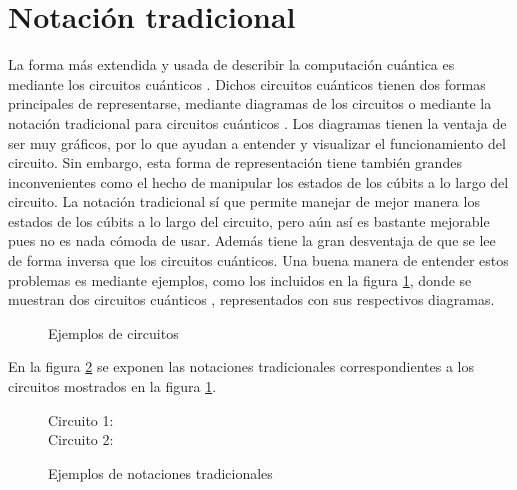 \documentclass[10pt,conference,a4paper]{IEEEtran}
\begin{document}
    \section{Notación tradicional}
    \label{seccion:2}
    La forma más extendida y usada de describir la computación cuántica es mediante los circuitos cuánticos \cite{Deutsch}. Dichos circuitos cuánticos tienen dos formas principales de representarse, mediante diagramas de los circuitos o mediante la notación tradicional para circuitos cuánticos \cite{Nielsen_Chuang}. Los diagramas tienen la ventaja de ser muy gráficos, por lo que ayudan a entender y visualizar el funcionamiento del circuito. Sin embargo, esta forma de representación tiene también grandes inconvenientes como el hecho de manipular los estados de los cúbits a lo largo del circuito. La notación tradicional sí que permite manejar de mejor manera los estados de los cúbits a lo largo del circuito, pero aún así es bastante mejorable pues no es nada cómoda de usar. Además tiene la gran desventaja de que se lee de forma inversa que los circuitos cuánticos. Una buena manera de entender estos problemas es mediante ejemplos, como los incluidos en la figura \ref{Fig1}, donde se muestran dos circuitos cuánticos%
    , representados con sus respectivos diagramas.

    \hypertarget{fig:ejemplos}{
        \begin{figure}[htb!]
            \centering
            \caption{Ejemplos de circuitos}
            \label{Fig1}
        \end{figure}}
    \newpage
    En la figura \ref{Fig2} se exponen las notaciones tradicionales correspondientes a los circuitos mostrados en la figura  \ref{Fig1}.


    \begin{figure}[htb!]
        \begin{center}
            Circuito 1: \\
            \vspace{1.5mm}
            Circuito 2: \\
        \end{center}
        \caption{Ejemplos de notaciones tradicionales}
        \label{Fig2}
    \end{figure}
\end{document}
